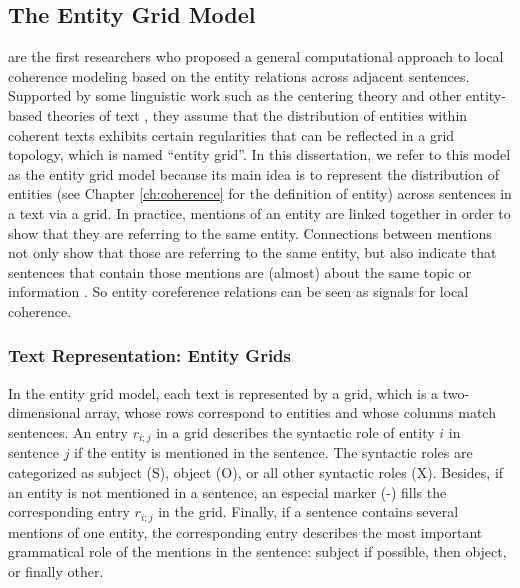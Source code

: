 \subsection{The Entity Grid Model}
\label{sec:rel-ent-grid} 

 are the first researchers who proposed a general computational approach to local coherence modeling based on the entity relations across adjacent sentences.  
Supported by some linguistic work such as the centering theory \cite{grosz95} and other entity-based theories of text \cite{prince81a}, they assume that the distribution of entities within coherent texts exhibits certain regularities that can be reflected in a grid topology, which is named  ``entity grid''.  
In this dissertation, we refer to this model as the entity grid model because its main idea is to represent the distribution of entities (see Chapter \ref{ch:coherence} for the definition of entity) across sentences in a text via a grid.   
In practice, mentions of an entity are linked together in order to show that they are referring to the same entity. 
Connections between mentions not only show that those are referring to the same entity, but also indicate that sentences that contain those mentions are (almost) about the same topic or information \cite{barzilay08}. 
So entity coreference relations can be seen as signals for local coherence. 

\subsubsection{Text Representation: Entity Grids}

In the entity grid model, each text is represented by a grid, which is a two-dimensional array, whose rows correspond to entities and whose columns match sentences.
An entry $r_{i;j}$ in a grid describes the syntactic role of entity $i$ in sentence $j$ if the entity is mentioned in the sentence. 
The syntactic roles are categorized as subject (S), object (O), or all other syntactic roles (X). 
Besides, if an entity is not mentioned in a sentence, an especial marker (-) fills the corresponding entry $r_{i;j}$ in the grid. 
Finally, if a sentence contains several mentions of one entity, the corresponding entry describes the most important grammatical role of the mentions in the sentence: subject if possible, then object, or finally other. 

